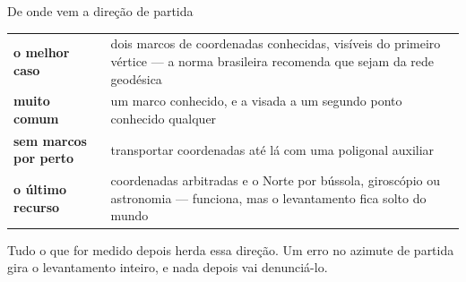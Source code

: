\documentclass[aspectratio=169,11pt]{beamer}
\begin{document}
\begin{frame}{De onde vem a direção de partida}
  \centering
  \small
  \small
  \renewcommand{\arraystretch}{1.2}
  \begin{tabular}{lp{7.5cm}}
    \toprule
    \textbf{o melhor caso} & dois marcos de coordenadas conhecidas, visíveis do primeiro
      vértice --- a norma brasileira recomenda que sejam da rede geodésica \\
    \textbf{muito comum} & um marco conhecido, e a visada a um segundo ponto conhecido
      qualquer \\
    \textbf{sem marcos por perto} & transportar coordenadas até lá com uma poligonal
      auxiliar \\
    \textbf{o último recurso} & coordenadas arbitradas e o Norte por bússola, giroscópio ou
      astronomia --- funciona, mas o levantamento fica solto do mundo \\
    \bottomrule
  \end{tabular}
  \medskip

  \begin{cuidado}[title={Uma escolha que fica para sempre}]
    \small Tudo o que for medido depois \alert{herda} essa direção. Um erro no azimute de
    partida gira o levantamento inteiro, e nada depois vai denunciá-lo.
  \end{cuidado}
\end{frame}
\end{document}
